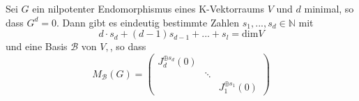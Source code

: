 \documentclass[9pt, a4paper, twocolumn, landscape]{article}
\newcommand{\comment}[1]{}
\begin{document}
\begin{theorem}
Sei $G$ ein nilpotenter Endomorphismus eines K-Vektorraums $V$ und $d$ minimal, so dass $G^d = 0$. Dann gibt es eindeutig bestimmte Zahlen $s_1, ..., s_d \in \mathbb{N}$ mit 
$$d \cdot s_d +(d - 1)s_{d-1} + ... + s_l = \mathrm{dim} V$$
und eine Basis $\mathcal{B}$ von $V,$, so dass 
$$M_\mathcal{B}(G) =
\left( \begin{array}{ccc} J_d^{\oplus s_d}(0) & & \\ & \ddots & \\ & & J_1^{\oplus s_1}(0) 

\end{array} \right)
$$
\comment{
$$
\left( \begin{array}{cccccccccc}
{J_{d}} & {} & {} & {} & {} & {} & {} & {} & {} & {}
\\ {} & {\ddots} & {} & {} & {} & {} & {} & {} & {0} & {}
\\ {} & {} & {J_{d}} & {} & {} & {} & {} & {} & {} & {}
\\ {} & {} & {} & {J_{d-1}} & {} & {} & {} & {} & {} & {}
\\ {} & {} & {} & {} & {}\ddots & {} & {} & {} & {} & {}
\\ {} & {} & {} & {} & {} & {J_{d-1}} & {} & {} & {} & {}
\\ {} & {} & {} & {} & {} & {} & {\ddots} & {} & {} & {}
\\ {} & {} & {} & {} & {} & {} & {} & {J_{l}} & {} & {}
\\ {} & {0} & {} & {} & {} & {} & {} & {} & {\ddots} & {}
\\ {} & {} & {} & {} & {} & {} & {} & {} & {} & {J_{l}}
\end{array} 
\right),$$
\\wobei $J_d$ $s_d$-mal, $J_{d-1}$ $s_{d-1}$-mal, ... und $J_l$ $s_1$-mal vorkommt.
}

\end{theorem}
\end{document}
